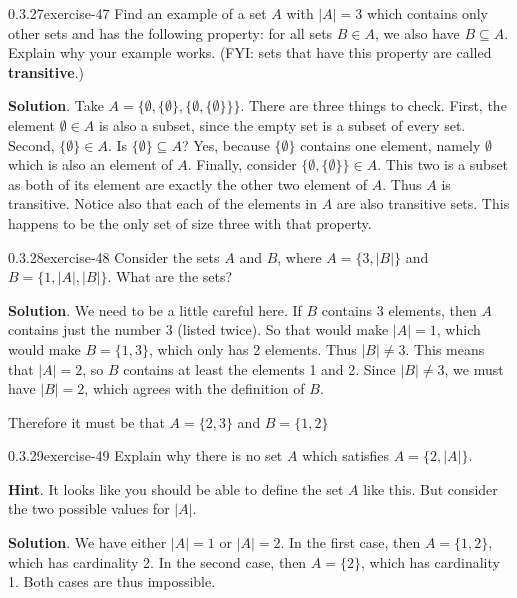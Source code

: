 \documentclass[twoside,11pt,]{book}
\newcommand{\terminology}[1]{\textbf{#1}}
\numberwithin{equation}{chapter}
\newcommand{\card}[1]{\left| #1 \right|}
\begin{document}
\begin{divisionsolution}{0.3.27}{}{exercise-47}%
\hypertarget{p-778}{}%
Find an example of a set \(A\) with \(|A| = 3\) which contains only other sets and has the following property: for all sets \(B \in A\), we also have \(B \subseteq A\). Explain why your example works. (FYI: sets that have this property are called \terminology{transitive}.)%
\par\smallskip%
\noindent\textbf{Solution}.\quad%
\hypertarget{p-779}{}%
Take \(A = \{\emptyset, \{\emptyset\}, \{\emptyset, \{\emptyset\}\}\}\). There are three things to check. First, the element \(\emptyset \in A\) is also a subset, since the empty set is a subset of every set. Second, \(\{\emptyset\}\in A\). Is \(\{\emptyset\} \subseteq A\)? Yes, because \(\{\emptyset\}\) contains one element, namely \(\emptyset\) which is also an element of \(A\). Finally, consider \(\{\emptyset, \{\emptyset\}\}\in A\). This two is a subset as both of its element are exactly the other two element of \(A\). Thus \(A\) is transitive. Notice also that each of the elements in \(A\) are also transitive sets. This happens to be the only set of size three with that property.%
\end{divisionsolution}%
\begin{divisionsolution}{0.3.28}{}{exercise-48}%
\hypertarget{p-780}{}%
Consider the sets \(A\) and \(B\), where \(A = \{3, |B|\}\) and \(B = \{1, |A|, |B|\}\).  What are the sets?%
\par\smallskip%
\noindent\textbf{Solution}.\quad%
\hypertarget{p-781}{}%
We need to be a little careful here.  If \(B\) contains 3 elements, then \(A\) contains just the number 3 (listed twice).  So that would make \(|A| = 1\), which would make \(B = \{1, 3\}\), which only has 2 elements.  Thus \(|B| \ne 3\).  This means that \(|A| = 2\), so \(B\) contains at least the elements 1 and 2.  Since \(\card{B} \ne 3\), we must have \(\card{B} = 2\), which agrees with the definition of \(B\).%
\par
\hypertarget{p-782}{}%
Therefore it must be that \(A = \{2,3\}\) and \(B = \{1, 2\}\)%
\end{divisionsolution}%
\begin{divisionsolution}{0.3.29}{}{exercise-49}%
\hypertarget{p-783}{}%
Explain why there is no set \(A\) which satisfies \(A = \{2, \card{A}\}\).%
\par\smallskip%
\noindent\textbf{Hint}.\quad%
\hypertarget{p-784}{}%
It looks like you should be able to define the set \(A\) like this.  But consider the two possible values for \(\card{A}\).%
\par\smallskip%
\noindent\textbf{Solution}.\quad%
\hypertarget{p-785}{}%
We have either \(\card{A} = 1\) or \(\card{A} = 2\).  In the first case, then \(A = \{1,2\}\), which has cardinality 2.  In the second case, then \(A = \{2\}\), which has cardinality 1.  Both cases are thus impossible.%
\end{divisionsolution}%
\end{document}
